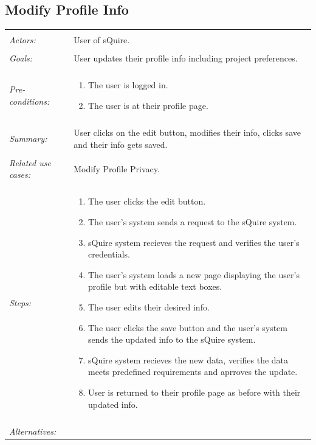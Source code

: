 \documentclass[11pt]{report}
\begin{document}
\subsection{Modify Profile Info}
\begin{tabular}{ p{2cm} p{12cm} }
 \hline
 \\
 \textit{Actors:} & User of sQuire. \\ 
 \\
 \textit{Goals:} & User updates their profile info including project preferences. \\
 \\
 \textit{Pre-conditions:} & \begin{enumerate}
  \item The user is logged in.
  \item The user is at their profile page.
 \end{enumerate} \\
 \\
 \textit{Summary:} & User clicks on the edit button, modifies their info, clicks save and their info gets saved.\\ 
 \\
 \textit{Related use cases:} & Modify Profile Privacy. \\ 
 \\
 \textit{Steps:} & \begin{enumerate}
  \item The user clicks the edit button.
  \item The user's system sends a request to the sQuire system.
  \item sQuire system recieves the request and verifies the user's credentials.
  \item The user's system loads a new page displaying the user's profile but with editable text boxes.
  \item The user edits their desired info.
  \item The user clicks the save button and the user's system sends the updated info to the sQuire system.
  \item sQuire system recieves the new data, verifies the data meets predefined requirements and aprroves the update.
  \item User is returned to their profile page as before with their updated info.
 \end{enumerate} \\
 \\
 \textit{Alternatives:} & \begin{enumerate} 

\end{enumerate}
\end{tabular}
\end{document}
